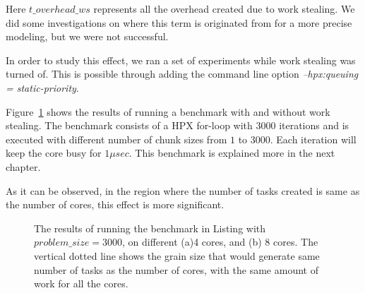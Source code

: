 Here $t\_{overhead\_{ws}}$ represents all the overhead created due to work stealing. We did some investigations on where this term is originated from for a more precise modeling, but we were not successful. 

In order to study this effect, we ran a set of experiments while work stealing was turned of. This is possible through adding the command line option \emph{--hpx:queuing = static-priority}.

Figure~\ref{fig40} shows the results of running a benchmark with and without work stealing. The benchmark consists of a HPX for-loop with $3000$ iterations and is executed with different number of chunk sizes from $1$ to $3000$. Each iteration will keep the core busy for $1\mu{sec}$. This benchmark is explained more in the next chapter.

As it can be observed, in the region where the number of tasks created is same as the number of cores, this effect is more significant.

\vspace{\baselineskip}	
\begin{figure}[H]
	\centering
	\caption{The results of running the benchmark in Listing with $problem\_size=3000$, on different (a)4 cores, and (b) 8 cores. The vertical dotted line shows the grain size that would generate same number of tasks as the number of cores, with the same amount of work for all the cores.}\label{fig40}		
\end{figure}

